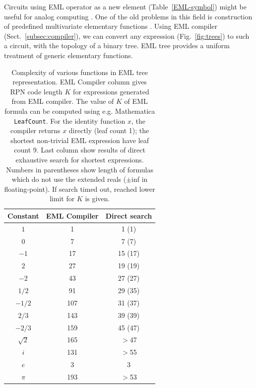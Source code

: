 \documentclass[12pt]{article}
\begin{document}
Circuits using EML operator as a new element (Table~\ref{EML-symbol}) might be useful for analog computing \cite{Ulmann+2022}. One of the old problems in this field is construction of predefined multivariate elementary functions \cite{Ulmann03032024}. Using EML compiler (Sect.~\ref{subsec:compiler}), we can convert any expression (Fig.~\ref{fig:trees}) to such a circuit, with the topology of a binary tree. EML tree provides a uniform treatment of generic elementary functions.  



\begin{table}[]
    
    \caption{
	Complexity of various functions in EML tree representation. EML Compiler column gives RPN code length $K$ for expressions generated from EML compiler. The value of $K$ of EML formula can be computed using e.g. Mathematica \texttt{LeafCount}. For the identity function $x$, the compiler returns $x$ directly (leaf count 1); the shortest non-trivial EML expression have leaf count 9. Last column show results of direct exhaustive search for shortest expressions. Numbers in parentheses show length of formulas which do not use the extended reals ($\pm$inf in floating-point). If search timed out, reached lower limit for $K$ is given. 
	\label{tbl:leaf_count}
	} 
    
    \centering
    \begin{tabular}{c|cc}
     Constant & EML Compiler & Direct search  \\
      \hline
        $1$              &  1           &  1 (1)  \\
		$0$              &  7           &  7 (7)  \\
        $-1$             &  17          & 15 (17) \\
        $2$              &  27          & 19 (19) \\
        $-2$             &  43          & 27 (27) \\
        $1/2$            &  91          & 29 (35) \\
        $-1/2$           &  107         & 31 (37) \\
        $2/3$            &  143         & 39 (39) \\
        $-2/3$           &  159         & 45 (47) \\
        $\sqrt{2}$       &  165         & $>$47 \\
        $i$              &  131         & $>$55  \\
        $e$              &  3           &  3  \\
        $\pi$            &  193         & $>$53  \\
    \end{tabular}


\end{table}
\end{document}
